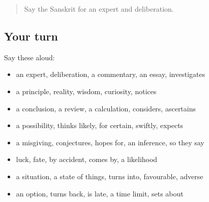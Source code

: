 \begin{quote}
Say the Sanskrit for an expert and deliberation.
\end{quote}

\subsection*{Your turn}
Say these aloud:

\begin{itemize}
\raggedright
  \item an expert, deliberation, a commentary, an essay, investigates
  \item a principle, reality, wisdom, curiosity, notices
  \item a conclusion, a review, a calculation, considers, ascertains
  \item a possibility, thinks likely, for certain, swiftly, expects
  \item a misgiving, conjectures, hopes for, an inference, so they say
  \item luck, fate, by accident, comes by, a likelihood
  \item a situation, a state of things, turns into, favourable, adverse
  \item an option, turns back, is late, a time limit, sets about
\end{itemize}

